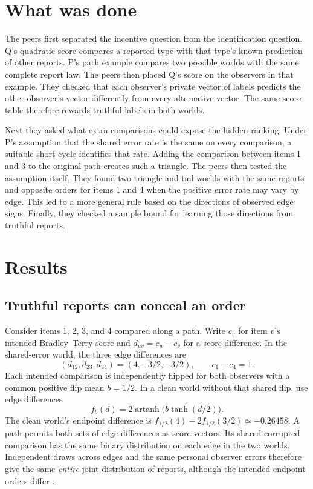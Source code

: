 \documentclass{article}
\begin{document}
\section{What was done}

The peers first separated the incentive question from the identification question. Q's quadratic score
compares a reported type with that type's known prediction of other reports. P's path example compares two
possible worlds with the same complete report law. The peers then placed Q's score on the observers in that
example. They checked that each observer's private vector of labels predicts the other observer's vector
differently from every alternative vector. The same score table therefore rewards truthful labels in both
worlds.

Next they asked what extra comparisons could expose the hidden ranking. Under P's assumption that the shared
error rate is the same on every comparison, a suitable short cycle identifies that rate. Adding the comparison
between items 1 and 3 to the original path creates such a triangle. The peers then tested the assumption
itself. They found two triangle-and-tail worlds with the same reports and opposite orders for items 1 and 4
when the positive error rate may vary by edge. This led to a more general rule based on the directions of
observed edge signs. Finally, they checked a sample bound for learning those directions from truthful reports.

\section{Results}

\subsection{Truthful reports can conceal an order}

Consider items 1, 2, 3, and 4 compared along a path. Write \(c_v\) for item \(v\)'s intended Bradley--Terry
score and \(d_{uv}=c_u-c_v\) for a score difference. In the shared-error world, the three edge differences are
\[
(d_{12},d_{23},d_{34})=(4,-3/2,-3/2),
\qquad c_1-c_4=1.
\]
Each intended comparison is independently flipped for both observers with a common positive flip mean
\(b=1/2\). In a clean world without that shared flip, use edge differences
\[
f_b(d)=2\operatorname{artanh}\bigl(b\tanh(d/2)\bigr).
\]
The clean world's endpoint difference is \(f_{1/2}(4)-2f_{1/2}(3/2)\simeq-0.26458\). A path permits both sets
of edge differences as score vectors. Its shared corrupted comparison has the same binary distribution on each
edge in the two worlds. Independent draws across edges and the same personal observer errors therefore give
the same \emph{entire} joint distribution of reports, although the intended endpoint orders differ \cite{P}.
\end{document}

